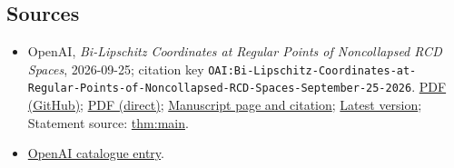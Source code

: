 \documentclass[11pt]{article}
\begin{document}
\subsection{Sources}
\begin{itemize}
\item OpenAI, \emph{Bi-Lipschitz Coordinates at Regular Points of Noncollapsed RCD Spaces}, 2026-09-25; citation key \texttt{OAI:Bi-Lipschitz-Coordinates-at-Regular-Points-of-Noncollapsed-RCD-Spaces-September-25-2026}. \href{https://github.com/openai/math/blob/adc7f1241b42e322a6451854ab7e4b4c146bf78a/preprints/Bi-Lipschitz-Coordinates-at-Regular-Points-of-Noncollapsed-RCD-Spaces-September-25-2026/paper.pdf}{PDF (GitHub)}; \href{https://github.com/openai/math/raw/adc7f1241b42e322a6451854ab7e4b4c146bf78a/preprints/Bi-Lipschitz-Coordinates-at-Regular-Points-of-Noncollapsed-RCD-Spaces-September-25-2026/paper.pdf}{PDF (direct)}; \href{https://github.com/openai/math/blob/adc7f1241b42e322a6451854ab7e4b4c146bf78a/preprints/Bi-Lipschitz-Coordinates-at-Regular-Points-of-Noncollapsed-RCD-Spaces-September-25-2026/README.md}{Manuscript page and citation}; \href{https://github.com/openai/math/blob/main/preprints/Bi-Lipschitz-Coordinates-at-Regular-Points-of-Noncollapsed-RCD-Spaces-September-25-2026/paper.pdf}{Latest version}; Statement source: \href{https://github.com/openai/math/blob/adc7f1241b42e322a6451854ab7e4b4c146bf78a/preprints/Bi-Lipschitz-Coordinates-at-Regular-Points-of-Noncollapsed-RCD-Spaces-September-25-2026/build/source/introduction.tex\#L17}{thm:main}.
\item \href{https://github.com/openai/math/blob/adc7f1241b42e322a6451854ab7e4b4c146bf78a/CONTENTS.md}{OpenAI catalogue entry}.
\end{itemize}
\end{document}
